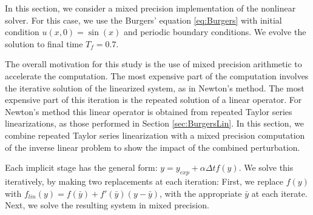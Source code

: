 \documentclass{siamart251104}
\newcommand{\dt}{\Delta t}
\newcommand{\ybar}{\bar{y}}
\begin{document}
In this section, we consider a mixed precision 
implementation of the nonlinear solver. For this case, we
use the Burgers' equation  \eqref{eq:Burgers}
 with   initial condition $u(x,0)= \sin(x)$  and periodic boundary conditions.
 We evolve the solution to final time $T_f =0.7$.

The overall motivation for this study is the use of mixed precision arithmetic to accelerate the computation. The most expensive part of the computation involves the iterative solution of the linearized system, as in Newton's method. The most expensive part of this iteration is the repeated solution of a linear operator. For Newton's method this linear operator is 
obtained from repeated Taylor series linearizations, as those performed in Section \ref{sec:BurgersLin}. In this section, we combine repeated Taylor series  linearization with a mixed precision computation of the inverse linear problem to show the impact of the combined perturbation.



Each implicit stage has the  general form:
$ y = y_{exp} + \alpha \dt f(y).$
We solve this iteratively, by making two replacements at each iteration: 
First, we replace $f(y)$ with 
$f_{lin}(y) = f(\bar{y}) +  f'(\ybar) \left( y - \bar{y} \right) $,
with the appropriate  $\ybar$  at each iterate.
Next, we solve the resulting system in mixed precision. 
\end{document}
